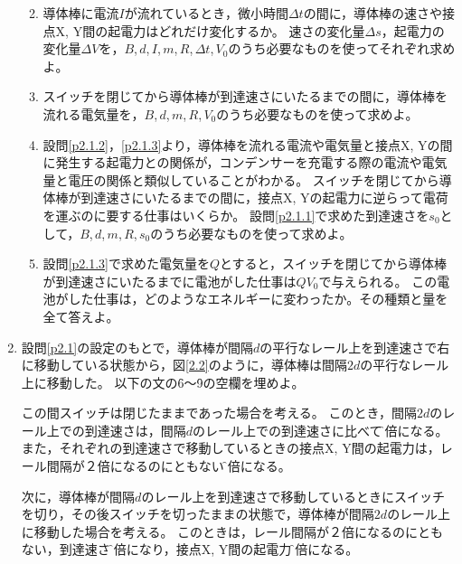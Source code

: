 \documentclass[b5paper, papersize, fleqn, 11pt, dvipdfmx, bold, nodots]{jsarticle}
\begin{document}
\begin{enumerate}[label=\Roman*, itemindent=1zw]
\begin{enumerate}[label=\Kakko*, topsep=0zw]
    \newpage

    \item\label{p2.1.2} 導体棒に電流$I$が流れているとき，微小時間$\varDelta t$の間に，導体棒の速さや接点X, Y間の起電力はどれだけ変化するか。
    速さの変化量$\varDelta s$，起電力の変化量$\varDelta V$を，$B$,\,$d$,\,$I$,\,$m$,\,$R$,\,$\varDelta t$,\,$V_0$のうち必要なものを使ってそれぞれ求めよ。

    \item\label{p2.1.3} スイッチを閉じてから導体棒が到達速さにいたるまでの間に，導体棒を流れる電気量を，$B$,\,$d$,\,$m$,\,$R$,\,$V_0$のうち必要なものを使って求めよ。

    \item 設問\ref{p2.1.2}，\ref{p2.1.3}より，導体棒を流れる電流や電気量と接点X, Yの間に発生する起電力との関係が，コンデンサーを充電する際の電流や電気量と電圧の関係と類似していることがわかる。
    スイッチを閉じてから導体棒が到達速さにいたるまでの間に，接点X, Yの起電力に逆らって電荷を運ぶのに要する仕事はいくらか。
    設問\ref{p2.1.1}で求めた到達速さを$s_0$として，$B$,\,$d$,\,$m$,\,$R$,\,$s_0$のうち必要なものを使って求めよ。

    \item\label{p2.1.5} 設問\ref{p2.1.3}で求めた電気量を$Q$とすると，スイッチを閉じてから導体棒が到達速さにいたるまでに電池がした仕事は$QV_0$で与えられる。
    この電池がした仕事は，どのようなエネルギーに変わったか。その種類と量を全て答えよ。
  \end{enumerate}

  \newpage

  \item 設問\ref{p2.1}の設定のもとで，導体棒が間隔$d$の平行なレール上を到達速さで右に移動している状態から，図\ref{2.2}のように，導体棒は間隔$2d$の平行なレール上に移動した。
  以下の文の\f{6}〜\f{9}の空欄を埋めよ。

  \bigskip

  この間スイッチは閉じたままであった場合を考える。
  このとき，間隔$2d$のレール上での到達速さは，間隔$d$のレール上での到達速さに比べて，\f{}倍になる。
  また，それぞれの到達速さで移動しているときの接点X, Y間の起電力は，レール間隔が２倍になるのにともない，\f{}倍になる。

  次に，導体棒が間隔$d$のレール上を到達速さで移動しているときにスイッチを切り，その後スイッチを切ったままの状態で，導体棒が間隔$2d$のレール上に移動した場合を考える。
  このときは，レール間隔が２倍になるのにともない，到達速さは\f{}倍になり，接点X, Y間の起電力は\f{}倍になる。

  \newpage


\end{enumerate}
\end{document}
